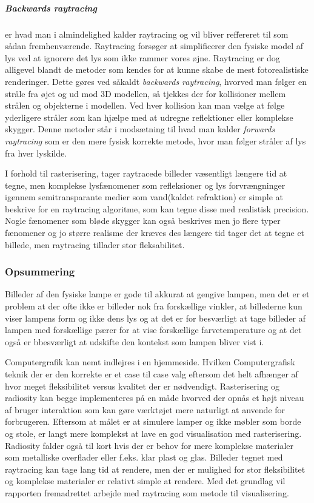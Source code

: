 \subparagraph{Backwards raytracing} er hvad man i almindelighed kalder raytracing og vil bliver reffereret til som sådan fremhenværende. Raytracing forsøger at simplificerer den fysiske model af lys ved at ignorere det lys som ikke rammer vores øjne. Raytracing er dog alligevel blandt de metoder som kendes for at kunne skabe de mest fotorealistiske renderinger. Dette gøres ved såkaldt \textit{backwards raytracing}, hvorved man følger en stråle fra øjet og ud mod 3D modellen, så tjekkes der for kollisioner mellem strålen og objekterne i modellen. Ved hver kollision kan man vælge at følge yderligere stråler som kan hjælpe med at udregne reflektioner eller komplekse skygger. Denne metoder står i modsætning til hvad man kalder \textit{forwards raytracing} som er den mere fysisk korrekte metode, hvor man følger stråler af lys fra hver lyskilde.

I forhold til rasterisering, tager raytracede billeder væsentligt længere tid at tegne, men komplekse lysfænomener som refleksioner og lys forvrængninger igennem semitransparante medier som vand(kaldet refraktion) er simple at beskrive for en raytracing algoritme, som kan tegne disse med realistisk precision. Nogle fænomener som bløde skygger kan også beskrives men jo flere typer fænomener og jo større realisme der kræves des længere tid tager det at tegne et billede, men raytracing tillader stor fleksabilitet.

\subsubsection*{Opsummering}
Billeder af den fysiske lampe er gode til akkurat at gengive lampen, men det er et problem at der ofte ikke er billeder nok fra forskællige vinkler, at billederne kun viser lampens form og ikke dens lys og at det er for besværligt at tage billeder af lampen med forskællige pærer for at vise forskællige farvetemperature og at det også er bbesværligt at udskifte den kontekst som lampen bliver vist i. 

Computergrafik kan nemt indlejres i en hjemmeside. Hvilken Computergrafisk teknik der er den korrekte er et case til case valg eftersom det helt afhænger af hvor meget fleksibilitet versus kvalitet der er nødvendigt. Rasterisering og radiosity kan begge implementeres på en måde hvorved der opnås et højt niveau af bruger interaktion som kan gøre værktøjet mere naturligt at anvende for forbrugeren. Eftersom at målet er at simulere lamper og ikke møbler som borde og stole, er langt mere komplekst at lave en god visualisation med rasterisering. Radiosity falder også til kort hvis der er behov for mere komplekse materialer som metalliske overflader eller f.eks. klar plast og glas. Billeder tegnet med raytracing kan tage lang tid at rendere, men der er mulighed for stor fleksibilitet og komplekse materialer er relativt simple at rendere. Med det grundlag vil rapporten fremadrettet arbejde med raytracing som metode til visualisering.

